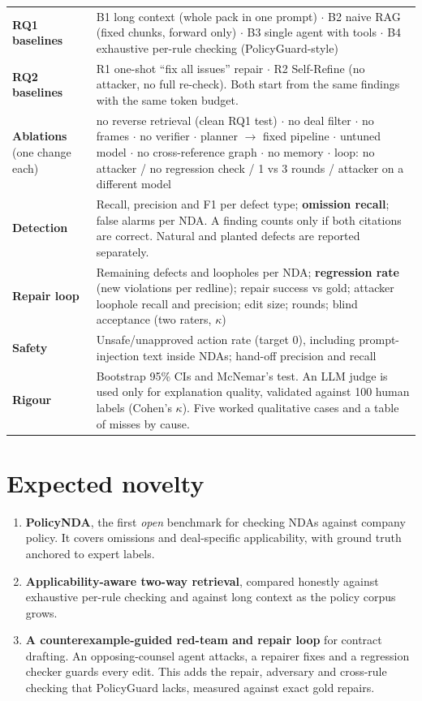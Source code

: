 \documentclass[11pt,a4paper]{article}
\begin{document}
\begin{table}[H]\small
\begin{tabularx}{\textwidth}{@{}>{\raggedright\arraybackslash}p{2.3cm}L@{}}
\toprule
\textbf{RQ1 baselines} & B1 long context (whole pack in one prompt) $\cdot$ B2 naive RAG (fixed chunks, forward only) $\cdot$ B3 single agent with tools $\cdot$ B4 exhaustive per-rule checking (PolicyGuard-style) \\
\textbf{RQ2 baselines} & R1 one-shot ``fix all issues'' repair $\cdot$ R2 Self-Refine (no attacker, no full re-check). Both start from the same findings with the same token budget. \\
\textbf{Ablations} (one change each) & no reverse retrieval (clean RQ1 test) $\cdot$ no deal filter $\cdot$ no frames $\cdot$ no verifier $\cdot$ planner $\rightarrow$ fixed pipeline $\cdot$ untuned model $\cdot$ no cross-reference graph $\cdot$ no memory $\cdot$ loop: no attacker / no regression check / 1 vs 3 rounds / attacker on a different model \\
\textbf{Detection} & Recall, precision and F1 per defect type; \textbf{omission recall}; false alarms per NDA. A finding counts only if both citations are correct. Natural and planted defects are reported separately. \\
\textbf{Repair loop} & Remaining defects and loopholes per NDA; \textbf{regression rate} (new violations per redline); repair success vs gold; attacker loophole recall and precision; edit size; rounds; blind acceptance (two raters, $\kappa$) \\
\textbf{Safety} & Unsafe/unapproved action rate (target 0), including prompt-injection text inside NDAs; hand-off precision and recall \\
\textbf{Rigour} & Bootstrap 95\% CIs and McNemar's test. An LLM judge is used only for explanation quality, validated against 100 human labels (Cohen's $\kappa$). Five worked qualitative cases and a table of misses by cause. \\
\bottomrule
\end{tabularx}
\end{table}

\section{Expected novelty}
\begin{enumerate}
\item \textbf{PolicyNDA}, the first \emph{open} benchmark for checking NDAs against company policy. It covers omissions and deal-specific applicability, with ground truth anchored to expert labels.
\item \textbf{Applicability-aware two-way retrieval}, compared honestly against exhaustive per-rule checking and against long context as the policy corpus grows.
\item \textbf{A counterexample-guided red-team and repair loop} for contract drafting. An opposing-counsel agent attacks, a repairer fixes and a regression checker guards every edit. This adds the repair, adversary and cross-rule checking that PolicyGuard lacks, measured against exact gold repairs.
\end{enumerate}
\end{document}
